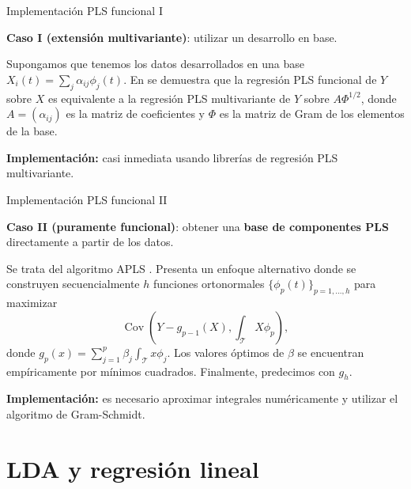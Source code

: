 \documentclass[10pt, professionalfonts]{beamer}
\begin{document}
\begin{frame}{Implementación PLS funcional I}

    {\color{Maroon}\textbf{Caso I (extensión multivariante)}:} utilizar un desarrollo en base.

    \vspace{1em}

    Supongamos que tenemos los datos desarrollados en una base $X_i(t)=\sum_j \alpha_{ij} \phi_j(t)$. En \textcite{aguilera2010using} se demuestra que la regresión PLS funcional de $Y$ sobre $X$ es equivalente a la regresión PLS multivariante de $Y$ sobre $A\Phi^{1/2}$, donde $A=(\alpha_{ij})$ es la matriz de coeficientes y $\Phi$ es la matriz de Gram de los elementos de la base.

    \textbf{Implementación:} casi inmediata usando librerías de regresión PLS multivariante.

\end{frame}

\begin{frame}{Implementación PLS funcional II}

  {\color{Maroon}\textbf{Caso II (puramente funcional)}:} obtener una \textbf{base de componentes PLS} directamente a partir de los datos.
  \vspace{1em}

  Se trata del algoritmo APLS \parencite{delaigle2012methodology}. Presenta un enfoque alternativo donde se construyen secuencialmente $h$ funciones ortonormales $\{\phi_p(t)\}_{p=1,\dots,h}$ para maximizar
  \[
  \operatorname{Cov}\left(Y - g_{p-1}(X), \int_{\mathcal T}X\phi_p\right),
  \]
  donde $g_p(x) = \sum_{j=1}^p \beta_j \int_{\mathcal T}x\phi_j$. Los valores óptimos de $\beta$ se encuentran empíricamente por mínimos cuadrados. Finalmente, predecimos con $g_h$.

  \textbf{Implementación:} es necesario aproximar integrales numéricamente y utilizar el algoritmo de Gram-Schmidt.
\end{frame}

\section{LDA y regresión lineal}


\end{document}
